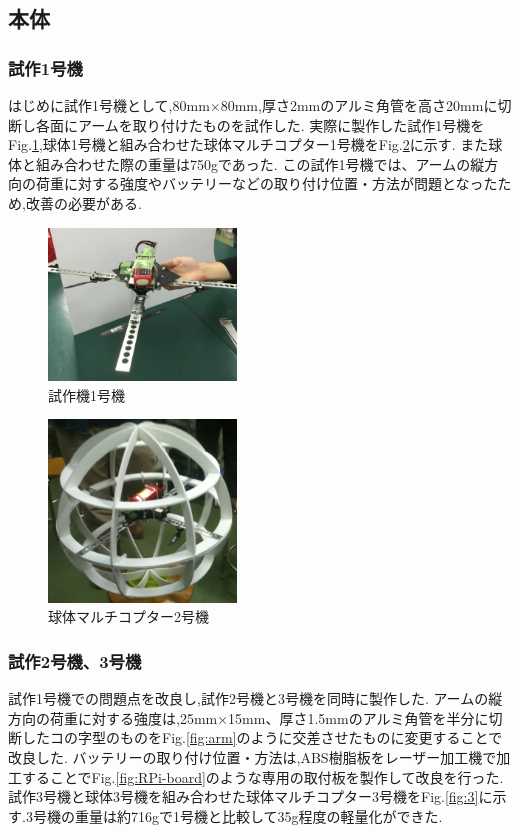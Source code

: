\documentclass[a4paper]{jarticle}
\begin{document}
\subsection{本体}

\subsubsection{試作1号機}
はじめに試作1号機として,80mm×80mm,厚さ2mmのアルミ角管を高さ20mmに切断し各面にアームを取り付けたものを試作した.
実際に製作した試作1号機をFig.\ref{fig:drone-1},球体1号機と組み合わせた球体マルチコプター1号機をFig.\ref{fig:1}に示す.
また球体と組み合わせた際の重量は750gであった.
この試作1号機では、アームの縦方向の荷重に対する強度やバッテリーなどの取り付け位置・方法が問題となったため,改善の必要がある.

\begin{figure}[htbp]
 \begin{center}
  \includegraphics[width=50mm]{image/multirotor-1.JPG}
  \caption{試作機1号機}
  \label{fig:drone-1}
 \end{center}
\end{figure}

\begin{figure}[htbp]
 \begin{center}
  \includegraphics[width=50mm]{image/1.JPG}
  \caption{球体マルチコプター2号機}
  \label{fig:1}
 \end{center}
\end{figure}

\subsubsection{試作2号機、3号機}
試作1号機での問題点を改良し,試作2号機と3号機を同時に製作した.
アームの縦方向の荷重に対する強度は,25mm×15mm、厚さ1.5mmのアルミ角管を半分に切断したコの字型のものをFig.\ref{fig:arm}のように交差させたものに変更することで改良した.
バッテリーの取り付け位置・方法は,ABS樹脂板をレーザー加工機で加工することでFig.\ref{fig:RPi-board}のような専用の取付板を製作して改良を行った.
試作3号機と球体3号機を組み合わせた球体マルチコプター3号機をFig.\ref{fig:3}に示す.3号機の重量は約716gで1号機と比較して35g程度の軽量化ができた.
\end{document}
